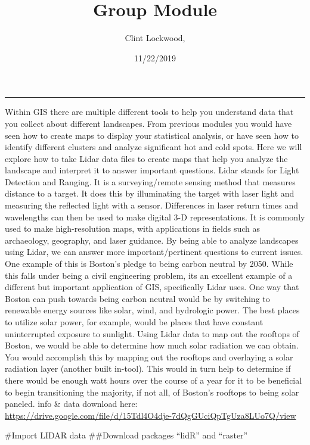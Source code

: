 \documentclass[]{article}
\title{Group Module}
\author{Clint Lockwood,}
\date{11/22/2019}
\begin{document}
\maketitle

{
\setcounter{tocdepth}{2}
\tableofcontents
}
\begin{center}\rule{0.5\linewidth}{\linethickness}\end{center}

Within GIS there are multiple different tools to help you understand
data that you collect about different landscapes. From previous modules
you would have seen how to create maps to display your statistical
analysis, or have seen how to identify different clusters and analyze
significant hot and cold spots. Here we will explore how to take Lidar
data files to create maps that help you analyze the landscape and
interpret it to answer important questions. Lidar stands for Light
Detection and Ranging. It is a surveying/remote sensing method that
measures distance to a target. It does this by illuminating the target
with laser light and measuring the reflected light with a sensor.
Differences in laser return times and wavelengths can then be used to
make digital 3-D representations. It is commonly used to make
high-resolution maps, with applications in fields such as archaeology,
geography, and laser guidance. By being able to analyze landscapes using
Lidar, we can answer more important/pertinent questions to current
issues. One example of this is Boston's pledge to being carbon neutral
by 2050. While this falls under being a civil engineering problem, its
an excellent example of a different but important application of GIS,
specifically Lidar uses. One way that Boston can push towards being
carbon neutral would be by switching to renewable energy sources like
solar, wind, and hydrologic power. The best places to utilize solar
power, for example, would be places that have constant uninterrupted
exposure to sunlight. Using Lidar data to map out the rooftops of
Boston, we would be able to determine how much solar radiation we can
obtain. You would accomplish this by mapping out the rooftops and
overlaying a solar radiation layer (another built in-tool). This would
in turn help to determine if there would be enough watt hours over the
course of a year for it to be beneficial to begin transitioning the
majority, if not all, of Boston's rooftops to being solar paneled. info
\& data download here:
\url{https://drive.google.com/file/d/15Tdl4O4dje-7dQgGUciQpTgUza8LUo7Q/view}

\#Import LIDAR data \#\#Download packages ``lidR'' and ``raster''
\end{document}
